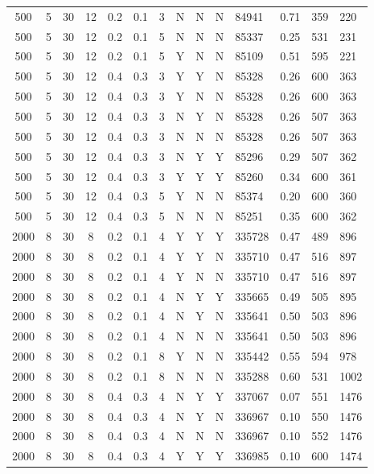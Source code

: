 \documentclass[a4paper, twocolumn, oneside, 10pt]{article}
\begin{document}
\begin{longtable}{|ccccccccccllll|}
	500 & 5 & 30 & 12 & 0.2 & 0.1 & 3 & N & N & N & 84941 & 0.71 & 359 & 220\\
	500 & 5 & 30 & 12 & 0.2 & 0.1 & 5 & N & N & N & 85337 & 0.25 & 531 & 231\\
	500 & 5 & 30 & 12 & 0.2 & 0.1 & 5 & Y & N & N & 85109 & 0.51 & 595 & 221\\
	500 & 5 & 30 & 12 & 0.4 & 0.3 & 3 & Y & Y & N & 85328 & 0.26 & 600 & 363\\
	500 & 5 & 30 & 12 & 0.4 & 0.3 & 3 & Y & N & N & 85328 & 0.26 & 600 & 363\\
	500 & 5 & 30 & 12 & 0.4 & 0.3 & 3 & N & Y & N & 85328 & 0.26 & 507 & 363\\
	500 & 5 & 30 & 12 & 0.4 & 0.3 & 3 & N & N & N & 85328 & 0.26 & 507 & 363\\
	500 & 5 & 30 & 12 & 0.4 & 0.3 & 3 & N & Y & Y & 85296 & 0.29 & 507 & 362\\
	500 & 5 & 30 & 12 & 0.4 & 0.3 & 3 & Y & Y & Y & 85260 & 0.34 & 600 & 361\\
	500 & 5 & 30 & 12 & 0.4 & 0.3 & 5 & Y & N & N & 85374 & 0.20 & 600 & 360\\
	500 & 5 & 30 & 12 & 0.4 & 0.3 & 5 & N & N & N & 85251 & 0.35 & 600 & 362\\
	2000 & 8 & 30 & 8 & 0.2 & 0.1 & 4 & Y & Y & Y & 335728 & 0.47 & 489 & 896\\
	2000 & 8 & 30 & 8 & 0.2 & 0.1 & 4 & Y & Y & N & 335710 & 0.47 & 516 & 897\\
	2000 & 8 & 30 & 8 & 0.2 & 0.1 & 4 & Y & N & N & 335710 & 0.47 & 516 & 897\\
	2000 & 8 & 30 & 8 & 0.2 & 0.1 & 4 & N & Y & Y & 335665 & 0.49 & 505 & 895\\
	2000 & 8 & 30 & 8 & 0.2 & 0.1 & 4 & N & Y & N & 335641 & 0.50 & 503 & 896\\
	2000 & 8 & 30 & 8 & 0.2 & 0.1 & 4 & N & N & N & 335641 & 0.50 & 503 & 896\\
	2000 & 8 & 30 & 8 & 0.2 & 0.1 & 8 & Y & N & N & 335442 & 0.55 & 594 & 978\\
	2000 & 8 & 30 & 8 & 0.2 & 0.1 & 8 & N & N & N & 335288 & 0.60 & 531 & 1002\\
	2000 & 8 & 30 & 8 & 0.4 & 0.3 & 4 & N & Y & Y & 337067 & 0.07 & 551 & 1476\\
	2000 & 8 & 30 & 8 & 0.4 & 0.3 & 4 & N & Y & N & 336967 & 0.10 & 550 & 1476\\
	2000 & 8 & 30 & 8 & 0.4 & 0.3 & 4 & N & N & N & 336967 & 0.10 & 552 & 1476\\
	2000 & 8 & 30 & 8 & 0.4 & 0.3 & 4 & Y & Y & Y & 336985 & 0.10 & 600 & 1474\\

\end{longtable}
\end{document}
